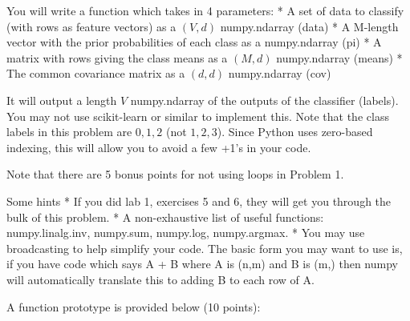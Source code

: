 \documentclass[11pt]{article}
\begin{document}
You will write a function which takes in 4 parameters: * A set of data
to classify (with rows as feature vectors) as a \((V,d)\) numpy.ndarray
(data) * A M-length vector with the prior probabilities of each class as
a numpy.ndarray (pi) * A matrix with rows giving the class means as a
\((M,d)\) numpy.ndarray (means) * The common covariance matrix as a
\((d,d)\) numpy.ndarray (cov)

It will output a length \(V\) numpy.ndarray of the outputs of the
classifier (labels). You may not use scikit-learn or similar to
implement this. Note that the class labels in this problem are \(0,1,2\)
(not \(1,2,3\)). Since Python uses zero-based indexing, this will allow
you to avoid a few +1's in your code.

Note that there are 5 bonus points for not using loops in Problem 1.

Some hints * If you did lab 1, exercises 5 and 6, they will get you
through the bulk of this problem. * A non-exhaustive list of useful
functions: numpy.linalg.inv, numpy.sum, numpy.log, numpy.argmax. * You
may use broadcasting to help simplify your code. The basic form you may
want to use is, if you have code which says A + B where A is (n,m) and B
is (m,) then numpy will automatically translate this to adding B to each
row of A.

A function prototype is provided below (10 points):
\end{document}
